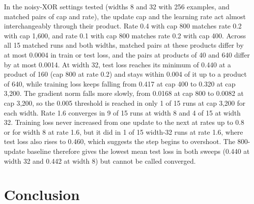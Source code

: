 \documentclass[11pt]{article}
\begin{document}
In the noisy-XOR settings tested (widths 8 and 32 with 256 examples, and matched pairs of cap and rate), the update cap and the learning rate act almost interchangeably through their product. Rate 0.4 with cap 800 matches rate 0.2 with cap 1,600, and rate 0.1 with cap 800 matches rate 0.2 with cap 400. Across all 15 matched runs and both widths, matched pairs at these products differ by at most 0.0004 in train or test loss, and the pairs at products of 40 and 640 differ by at most 0.0014. At width 32, test loss reaches its minimum of 0.440 at a product of 160 (cap 800 at rate 0.2) and stays within 0.004 of it up to a product of 640, while training loss keeps falling from 0.417 at cap 400 to 0.320 at cap 3,200. The gradient norm falls more slowly, from 0.0168 at cap 800 to 0.0082 at cap 3,200, so the 0.005 threshold is reached in only 1 of 15 runs at cap 3,200 for each width. Rate 1.6 converges in 9 of 15 runs at width 8 and 4 of 15 at width 32. Training loss never increased from one update to the next at rates up to 0.8 or for width 8 at rate 1.6, but it did in 1 of 15 width-32 runs at rate 1.6, where test loss also rises to 0.460, which suggests the step begins to overshoot. The 800-update baseline therefore gives the lowest mean test loss in both sweeps (0.440 at width 32 and 0.442 at width 8) but cannot be called converged.

\section{Conclusion}\label{sec:conclusion}
\end{document}
